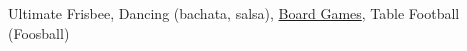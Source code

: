 \documentclass[11pt,a4paper,sans]{moderncv}        %
\begin{document}
Ultimate Frisbee, Dancing (bachata, salsa), \href{https://boardgamearena.com/player?section=prestige}{Board Games}, Table Football (Foosball)



% 


\end{document}
